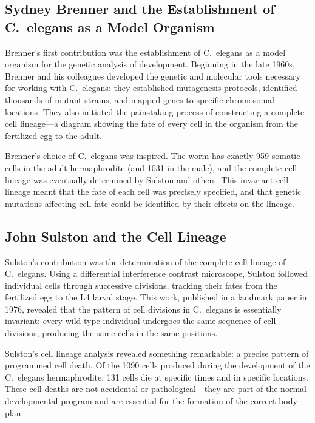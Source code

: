 \subsection{Sydney Brenner and the Establishment of C.\ elegans as a Model Organism}

Brenner's first contribution was the establishment of C.\ elegans as a model organism for the genetic analysis of development. Beginning in the late 1960s, Brenner and his colleagues developed the genetic and molecular tools necessary for working with C.\ elegans: they established mutagenesis protocols, identified thousands of mutant strains, and mapped genes to specific chromosomal locations. They also initiated the painstaking process of constructing a complete cell lineage---a diagram showing the fate of every cell in the organism from the fertilized egg to the adult.

Brenner's choice of C.\ elegans was inspired. The worm has exactly 959 somatic cells in the adult hermaphrodite (and 1031 in the male), and the complete cell lineage was eventually determined by Sulston and others. This invariant cell lineage meant that the fate of each cell was precisely specified, and that genetic mutations affecting cell fate could be identified by their effects on the lineage.

\subsection{John Sulston and the Cell Lineage}

Sulston's contribution was the determination of the complete cell lineage of C.\ elegans. Using a differential interference contrast microscope, Sulston followed individual cells through successive divisions, tracking their fates from the fertilized egg to the L4 larval stage. This work, published in a landmark paper in 1976, revealed that the pattern of cell divisions in C.\ elegans is essentially invariant: every wild-type individual undergoes the same sequence of cell divisions, producing the same cells in the same positions.

Sulston's cell lineage analysis revealed something remarkable: a precise pattern of programmed cell death. Of the 1090 cells produced during the development of the C.\ elegans hermaphrodite, 131 cells die at specific times and in specific locations. These cell deaths are not accidental or pathological---they are part of the normal developmental program and are essential for the formation of the correct body plan.

